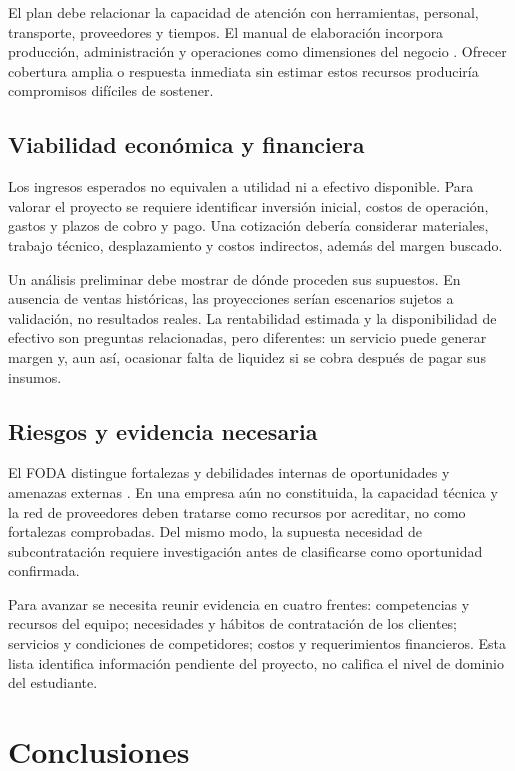 {El plan debe relacionar la capacidad de atención con herramientas, personal, transporte, proveedores y tiempos. El manual de elaboración incorpora producción, administración y operaciones como dimensiones del negocio \citep{manualGuiaPlanNegocio}. Ofrecer cobertura amplia o respuesta inmediata sin estimar estos recursos produciría compromisos difíciles de sostener.

\subsection{Viabilidad económica y financiera}

Los ingresos esperados no equivalen a utilidad ni a efectivo disponible. Para valorar el proyecto se requiere identificar inversión inicial, costos de operación, gastos y plazos de cobro y pago. Una cotización debería considerar materiales, trabajo técnico, desplazamiento y costos indirectos, además del margen buscado.

Un análisis preliminar debe mostrar de dónde proceden sus supuestos. En ausencia de ventas históricas, las proyecciones serían escenarios sujetos a validación, no resultados reales. La rentabilidad estimada y la disponibilidad de efectivo son preguntas relacionadas, pero diferentes: un servicio puede generar margen y, aun así, ocasionar falta de liquidez si se cobra después de pagar sus insumos.

\subsection{Riesgos y evidencia necesaria}

El FODA distingue fortalezas y debilidades internas de oportunidades y amenazas externas \citep{planNegociosGlosario2024}. En una empresa aún no constituida, la capacidad técnica y la red de proveedores deben tratarse como recursos por acreditar, no como fortalezas comprobadas. Del mismo modo, la supuesta necesidad de subcontratación requiere investigación antes de clasificarse como oportunidad confirmada.

Para avanzar se necesita reunir evidencia en cuatro frentes: competencias y recursos del equipo; necesidades y hábitos de contratación de los clientes; servicios y condiciones de competidores; costos y requerimientos financieros. Esta lista identifica información pendiente del proyecto, no califica el nivel de dominio del estudiante.

\section{Conclusiones}

}
